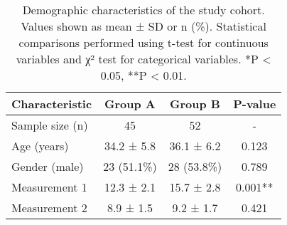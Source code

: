 
\begin{table}[htbp]
\centering
\caption{Demographic characteristics of the study cohort. Values shown as mean ± SD
or n (\%). Statistical comparisons performed using t-test for continuous variables
and χ² test for categorical variables. *P < 0.05, **P < 0.01.}
\label{tab:example01}
\begin{tabular}{lccc}
\hline
\textbf{Characteristic} & \textbf{Group A} & \textbf{Group B} & \textbf{P-value} \\
\hline
Sample size (n) & 45 & 52 & - \\
Age (years) & 34.2 ± 5.8 & 36.1 ± 6.2 & 0.123 \\
Gender (male) & 23 (51.1\%) & 28 (53.8\%) & 0.789 \\
Measurement 1 & 12.3 ± 2.1 & 15.7 ± 2.8 & 0.001** \\
Measurement 2 & 8.9 ± 1.5 & 9.2 ± 1.7 & 0.421 \\
\hline
\end{tabular}
\end{table}


